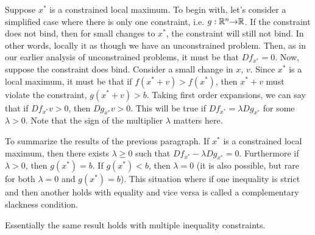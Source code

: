 Suppose $x^*$ is a constrained local maximum. To begin with, let's
consider a simplified case where there is only one constraint,
i.e. $g:\mathbb{R}^n {\rightarrow} \mathbb{R}$. If the constraint does not bind, then for small
changes to $x^*$, the constraint will still not bind. In other words,
locally it as though we have an unconstrained problem. Then, as in our
earlier analysis of unconstrained problems, it must be that $Df_{x^*}
= 0$. Now, suppose the constraint does bind. Consider a small change
in $x$, $v$. Since $x^*$ is a local maximum, it must be that if $f(x^*
+ v) > f(x^*)$, then $x^* + v$ must violate the constraint, $g(x^* +
v) > b$.  Taking first order expansions, we can say that if $Df_{x^*}
v > 0$, then $Dg_{x^*} v > 0$. This will be true if $Df_{x^*} =
\lambda Dg_{x^*}$ for some $\lambda > 0$. Note that the sign of the
multiplier $\lambda$ matters here. 

To summarize the results of the previous paragraph. If $x^*$ is a
constrained local maximum, then there exists $\lambda \geq 0$ such
that $Df_{x^*} - \lambda Dg_{x^*} = 0$. Furthermore if $\lambda > 0$, then
$g(x^*) = b$. If $g(x^*) < b$, then $\lambda = 0$ (it is also possible, but
rare for both $\lambda = 0$ and $g(x^*) = b$). This situation
where if one inequality is strict and then another holds with equality
and vice versa is called a complementary slackness condition. 

Essentially the same result holds with multiple inequality
constraints. 
 
